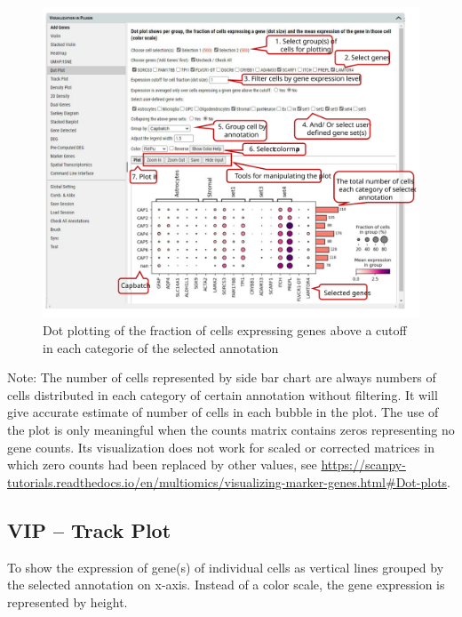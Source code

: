 \documentclass[
]{article}
\begin{document}
\begin{figure}
\centering
\includegraphics{figures/F11_label.svg}
\caption{Dot plotting of the fraction of cells expressing genes above a cutoff in each categorie of the selected annotation}
\end{figure}

Note: The number of cells represented by side bar chart are always numbers of cells distributed in each category of certain annotation without filtering. It will give accurate estimate of number of cells in each bubble in the plot. The use of the plot is only meaningful when the counts matrix contains zeros representing no gene counts. Its visualization does not work for scaled or corrected matrices in which zero counts had been replaced by other values, see \url{https://scanpy-tutorials.readthedocs.io/en/multiomics/visualizing-marker-genes.html\#Dot-plots}.

\hypertarget{vip-track-plot}{%
\subsection{VIP -- Track Plot}\label{vip-track-plot}}

To show the expression of gene(s) of individual cells as vertical lines grouped by the selected annotation on x-axis. Instead of a color scale, the gene expression is represented by height.
\end{document}
